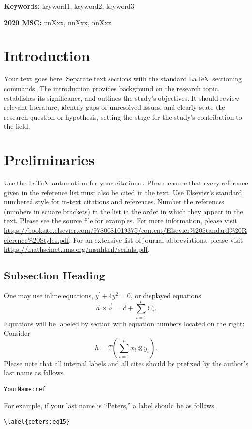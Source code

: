 \documentclass[12pt, a4paper, twoside]{article}
\newcommand{\mykeywords}[1]{%
    \noindent \textbf{Keywords:} #1 \par
}
\newcommand{\myMSC}[1]{
    \noindent \textbf{2020 MSC:} #1 \par
}
\theoremstyle{plain}
\theoremstyle{definition}
\theoremstyle{remark}
\numberwithin{equation}{section}
\begin{document}

\mykeywords{keyword1, keyword2, keyword3} %
\smallskip
\myMSC{nnXxx, nnXxx, nnXxx} %


\section{Introduction}\label{yourname:intro}
Your text goes here. Separate text sections with the standard \LaTeX\ sectioning commands. The introduction provides background on the research topic, establishes its significance, and outlines the study's objectives. It should review relevant literature, identify gaps or unresolved issues, and clearly state the research question or hypothesis, setting the stage for the study's contribution to the field.

\section{Preliminaries}\label{yourname:prelim}
Use the \LaTeX\ automatism for your citations \cite{yourname:book, yourname:bookchapter, yourname:article}. Please ensure that every reference given in the reference list must also be cited in the text. Use Elsevier's standard numbered style for in-text citations and references. 
Number the references (numbers in square brackets) in the list in the order in which they appear in the text. Please see the source file for examples. For more information, please visit \url{https://booksite.elsevier.com/9780081019375/content/Elsevier\%20Standard\%20Reference\%20Styles.pdf}. For an extensive list of journal abbreviations, please visit \url{https://mathscinet.ams.org/msnhtml/serials.pdf}.

\subsection{Subsection Heading}\label{yourname:intro_I}
One may use inline equations, $y^{\prime}+4y^2=0$, or displayed equations
\[
	\vec{a}\times\vec{b} = \vec{c}+\sum_{i=1}^n C_i.
\]
Equations will be labeled by section with equation numbers located on the right: Consider
\begin{equation}\label{yourname:eq15}
	h =T \left ( \sum_{i=1}^n x_i \otimes y_i \right ).
\end{equation}
Please note that all internal labels and all cites 
should be prefixed by the author's last name as follows.
\begin{verbatim}
YourName:ref
\end{verbatim}
For example, if your last name is ``Peters,''  a label should be as follows.
\begin{verbatim}
\label{peters:eq15}
\end{verbatim}
\end{document}
